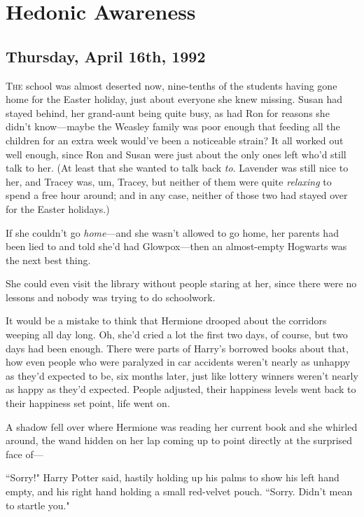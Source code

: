 \chapter{Hedonic Awareness}

\section{Thursday, April 16th, 1992}

\lettrine{T}{he} school was almost deserted now, nine-tenths of the students having gone home for the Easter holiday, just about everyone she knew missing. Susan had stayed behind, her grand-aunt being quite busy, as had Ron for reasons she didn't know—maybe the Weasley family was poor enough that feeding all the children for an extra week would've been a noticeable strain? It all worked out well enough, since Ron and Susan were just about the only ones left who'd still talk to her. (At least that she wanted to talk back \emph{to}. Lavender was still nice to her, and Tracey was, um, Tracey, but neither of them were quite \emph{relaxing} to spend a free hour around; and in any case, neither of those two had stayed over for the Easter holidays.)

If she couldn't go \emph{home}—and she wasn't allowed to go home, her parents had been lied to and told she'd had Glowpox—then an almost-empty Hogwarts was the next best thing.

She could even visit the library without people staring at her, since there were no lessons and nobody was trying to do schoolwork.

It would be a mistake to think that Hermione drooped about the corridors weeping all day long. Oh, she'd cried a lot the first two days, of course, but two days had been enough. There were parts of Harry's borrowed books about that, how even people who were paralyzed in car accidents weren't nearly as unhappy as they'd expected to be, six months later, just like lottery winners weren't nearly as happy as they'd expected. People adjusted, their happiness levels went back to their happiness set point, life went on.

A shadow fell over where Hermione was reading her current book and she whirled around, the wand hidden on her lap coming up to point directly at the surprised face of—

``Sorry!" Harry Potter said, hastily holding up his palms to show his left hand empty, and his right hand holding a small red-velvet pouch. ``Sorry. Didn't mean to startle you."

